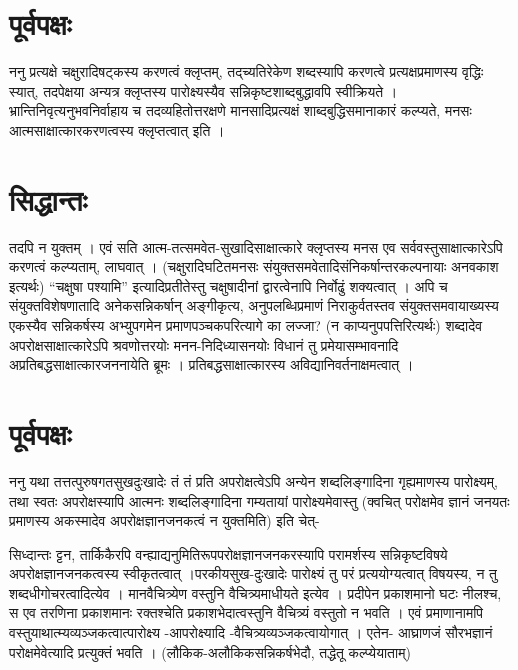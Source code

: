 {\section*{पूर्वपक्षः}

ननु प्रत्यक्षे चक्षुरादिषट्कस्य करणत्वं क्लृप्तम्, तद्च्यतिरेकेण शब्दस्यापि करणत्वे प्रत्यक्षप्रमाणस्य वृद्धिः स्यात्, तदपेक्षया अन्यत्र क्लृप्तस्य पारोक्ष्यस्यैव सन्निकृष्टशाब्दबुद्धावपि स्वीक्रियते । भ्रान्तिनिवृत्यनुभवनिर्वाहाय च तदव्यहितोत्तरक्षणे मानसादिप्रत्यक्षं शाब्दबुद्धिसमानाकारं कल्प्यते, मनसः आत्मसाक्षात्कारकरणत्वस्य क्लृप्तत्वात् इति ।

\section*{सिद्धान्तः}

तदपि न युक्तम् । एवं सति आत्म-तत्समवेत-सुखादिसाक्षात्कारे क्लृप्तस्य मनस एव सर्ववस्तुसाक्षात्कारेऽपि करणत्वं कल्प्यताम्, लाघवात् । (चक्षुरादिघटितमनसः संयुक्तसमवेतादिसंनिकर्षान्तरकल्पनायाः अनवकाश इत्यर्थः) “चक्षुषा पश्यामि” इत्यादिप्रतीतेस्तु चक्षुषादीनां द्वारत्वेनापि निर्वोढुं शक्यत्वात् । अपि च संयुक्तविशेषणातादि अनेकसन्निकर्षान् अङ्गीकृत्य, अनुपलब्धिप्रमाणं निराकुर्वतस्तव संयुक्तसमवायाख्यस्य एकस्यैव सन्निकर्षस्य अभ्युपगमेन प्रमाणपञ्चकपरित्यागे का लज्जा? (न काप्यनुपपत्तिरित्यर्थः) शब्दादेव अपरोक्षसाक्षात्कारेऽपि श्रवणोत्तरयोः मनन-निदिध्यासनयोः विधानं तु प्रमेयासम्भावनादि अप्रतिबद्धसाक्षात्कारजननायेति ब्रूमः । प्रतिबद्धसाक्षात्कारस्य अविद्यानिवर्तनाक्षमत्वात् ।

\section*{पूर्वपक्षः}

ननु  यथा तत्तत्पुरुषगतसुखदुःखादेः तं तं प्रति अपरोक्षत्वेऽपि अन्येन शब्दलिङ्गादिना गृह्यमाणस्य पारोक्ष्यम्, तथा स्वतः अपरोक्षस्यापि आत्मनः शब्दलिङ्गादिना गम्यतायां पारोक्ष्यमेवास्तु (क्वचित् परोक्षमेव ज्ञानं जनयतः प्रमाणस्य अकस्मादेव अपरोक्षज्ञानजनकत्वं न युक्तमिति) इति चेत्-

सिध्दान्तः ट्टन, तार्किकैरपि वन्ह्याद्यनुमितिरूपपरोक्षज्ञानजनकरस्यापि परामर्शस्य सन्निकृष्टविषये अपरोक्षज्ञानजनकत्वस्य स्वीकृतत्वात् ।परकीयसुख-दुःखादेः पारोक्ष्यं तु परं प्रत्ययोग्यत्वात् विषयस्य, न तु शब्दधीगोचरत्वादित्येव । मानवैचित्र्येण वस्तुनि वैचित्र्यमाधीयते इत्येव । प्रदीपेन प्रकाशमानो घटः नीलश्च, स एव तरणिना प्रकाशमानः रक्तश्चेति प्रकाशभेदात्वस्तुनि वैचित्र्यं वस्तुतो न भवति । एवं प्रमाणानामपि वस्तुयाथात्म्यव्यञ्जकत्वात्पारोक्ष्य -आपरोक्ष्यादि -वैचित्र्यव्यञ्जकत्वायोगात् । एतेन- आघ्राणजं सौरभज्ञानं परोक्षमेवेत्यादि प्रत्युक्तं भवति । (लौकिक-अलौकिकसन्निकर्षभेदौ, तद्धेतू कल्प्येयाताम्)

}
